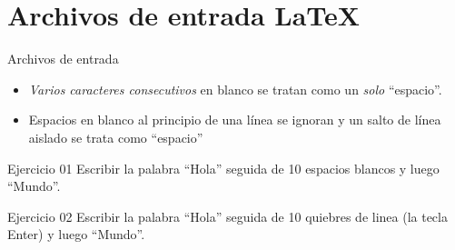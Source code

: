 
\section{Archivos de entrada \LaTeX{}}

\begin{frame}{Archivos de entrada}
    \begin{itemize}
        \item \emph{Varios caracteres consecutivos} en blanco se tratan como un \emph{solo} ``espacio''. 
        \item Espacios en blanco al principio de una l\'inea se ignoran y un salto de l\'inea aislado se trata como ``espacio''
    \end{itemize}
    \begin{exampleblock}{Ejercicio 01}
        Escribir la palabra ``Hola'' seguida de 10 espacios blancos y luego ``Mundo''.
    \end{exampleblock}
    \begin{exampleblock}{Ejercicio 02}
        Escribir la palabra ``Hola'' seguida de 10 quiebres de linea (la tecla Enter) y luego ``Mundo''.
    \end{exampleblock}
\end{frame}

